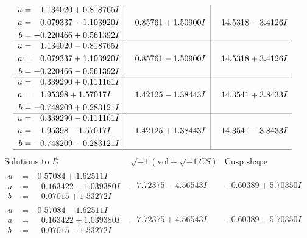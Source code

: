 \documentclass[1p]{elsarticle_modified}
\theoremstyle{definition}
\newcommand{\I}{\sqrt{-1}}
\begin{document}
$$\begin{array}{c|c|c}
\begin{aligned}
u &= \phantom{-}1.134020 + 0.818765 I \\
a &= \phantom{-}0.079337 - 1.103920 I \\
b &= -0.220466 + 0.561392 I\end{aligned}
 & \phantom{-}0.85761 + 1.50900 I & \phantom{-}14.5318 - 3.4126 I \\ \hline\begin{aligned}
u &= \phantom{-}1.134020 - 0.818765 I \\
a &= \phantom{-}0.079337 + 1.103920 I \\
b &= -0.220466 - 0.561392 I\end{aligned}
 & \phantom{-}0.85761 - 1.50900 I & \phantom{-}14.5318 + 3.4126 I \\ \hline\begin{aligned}
u &= \phantom{-}0.339290 + 0.111161 I \\
a &= \phantom{-}1.95398 + 1.57017 I \\
b &= -0.748209 + 0.283121 I\end{aligned}
 & \phantom{-}1.42125 - 1.38443 I & \phantom{-}14.3541 + 3.8433 I \\ \hline\begin{aligned}
u &= \phantom{-}0.339290 - 0.111161 I \\
a &= \phantom{-}1.95398 - 1.57017 I \\
b &= -0.748209 - 0.283121 I\end{aligned}
 & \phantom{-}1.42125 + 1.38443 I & \phantom{-}14.3541 - 3.8433 I\\
 \hline 
 \end{array}$$\newpage$$\begin{array}{c|c|c}  
\text{Solutions to }I^u_{2}& \I (\text{vol} + \sqrt{-1}CS) & \text{Cusp shape}\\
 \hline 
\begin{aligned}
u &= -0.57084 + 1.62511 I \\
a &= \phantom{-}0.163422 - 1.039380 I \\
b &= \phantom{-}0.07015 + 1.53272 I\end{aligned}
 & -7.72375 - 4.56543 I & -0.60389 + 5.70350 I \\ \hline\begin{aligned}
u &= -0.57084 - 1.62511 I \\
a &= \phantom{-}0.163422 + 1.039380 I \\
b &= \phantom{-}0.07015 - 1.53272 I\end{aligned}
 & -7.72375 + 4.56543 I & -0.60389 - 5.70350 I \\ \hline\begin{aligned}

\end{aligned}
\end{array}$$
\end{document}

